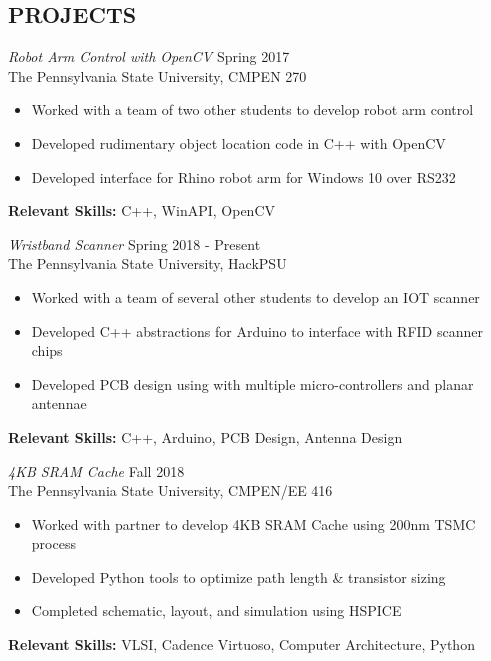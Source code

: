 \documentclass[line,margin]{res}
\begin{document}
\begin{resume}
		\newpage
		\section{PROJECTS}
		{\sl Robot Arm Control with OpenCV} \hfill Spring 2017\\
		The Pennsylvania State University, CMPEN 270
		\begin{itemize}  \itemsep -2pt
			\item Worked with a team of two other students to develop robot arm control
			\item Developed rudimentary object location code in C++ with OpenCV
			\item Developed interface for Rhino robot arm for Windows 10 over RS232 
			\vspace*{-\baselineskip}		
		\end{itemize}
		\textbf{Relevant Skills:} C++, WinAPI, OpenCV
		\newline
		
		{\sl Wristband Scanner} \hfill Spring 2018 - Present\\
		The Pennsylvania State University, HackPSU
		\begin{itemize}  \itemsep -2pt
			\item Worked with a team of several other students to develop an IOT scanner
			\item Developed C++ abstractions for Arduino to interface with RFID scanner chips
			\item Developed PCB design using with multiple micro-controllers and planar antennae
			\vspace*{-\baselineskip}		
		\end{itemize}
		\textbf{Relevant Skills:} C++, Arduino, PCB Design, Antenna Design
		
		{\sl 4KB SRAM Cache} \hfill Fall 2018\\
		The Pennsylvania State University, CMPEN/EE 416
		\begin{itemize}  \itemsep -2pt
			\item Worked with partner to develop 4KB SRAM Cache using 200nm TSMC process
			\item Developed Python tools to optimize path length \& transistor sizing
			\item Completed schematic, layout, and simulation using HSPICE
			\vspace*{-\baselineskip}		
		\end{itemize}
		\textbf{Relevant Skills:} VLSI, Cadence Virtuoso, Computer Architecture, Python
		

\end{resume}
\end{document}
